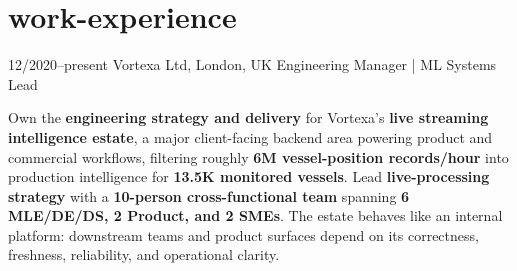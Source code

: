 \documentclass[]{../../../../friggeri-cv}
\begin{document}
\section{work-experience}
\begin{entrylist}
    \entry
    {12/2020--present}
    {Vortexa Ltd, London, UK}
    {Engineering Manager | ML Systems Lead}
    {
        {\small
        \setlength{\parindent}{0pt}
        \setlength{\leftskip}{0pt}
        Own the \textbf{engineering strategy and delivery} for Vortexa's \textbf{live streaming intelligence estate}, a major client-facing backend area powering product and commercial workflows, filtering roughly \textbf{6M vessel-position records/hour} into production intelligence for \textbf{13.5K monitored vessels}. Lead \textbf{live-processing strategy} with a \textbf{10-person cross-functional team} spanning \textbf{6 MLE/DE/DS, 2 Product, and 2 SMEs}. The estate behaves like an internal platform: downstream teams and product surfaces depend on its correctness, freshness, reliability, and operational clarity.

}}
\end{entrylist}
\end{document}
